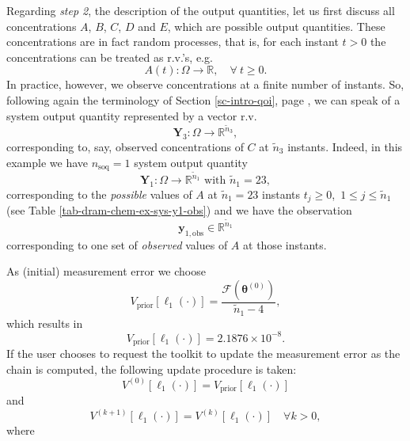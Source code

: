 Regarding {\it step 2}, the description of the output quantities, let us first discuss all concentrations $A$, $B$, $C$, $D$ and $E$, which are possible output quantities.
These concentrations are in fact random processes, that is, for each instant $t>0$ the concentrations can be treated as r.v.'s, e.g.
\begin{equation*}
A(t):\Omega\rightarrow\mathbb{R},\quad\forall~t\geqslant 0.
\end{equation*}
In practice, however, we observe concentrations at a finite number of instants.
So, following again the terminology of Section \ref{sc-intro-qoi}, page \pageref{sc-intro-qoi}, we can speak of a system output quantity
represented by a vector r.v. 
\begin{equation*}
\mathbf{Y}_3:\Omega\rightarrow\mathbb{R}^{{\tilde{n}}_3},
\end{equation*}
corresponding to, say, observed concentrations of $C$ at ${\tilde{n}}_3$ instants.
Indeed, in this example we have
$n_{\text{soq}}=1$ system output quantity
\begin{equation*}
\mathbf{Y}_1:\Omega\rightarrow\mathbb{R}^{{\tilde{n}}_1}\text{ with }{\tilde{n}}_1=23,
\end{equation*}
corresponding to the {\it possible} values of $A$ at ${\tilde{n}}_1=23$ instants $t_j\geqslant 0$,~$1\leqslant j\leqslant {\tilde{n}}_1$ (see Table \ref{tab-dram-chem-ex-sys-y1-obs})
and we have the observation 
\begin{equation*}
\mathbf{y}_{1,\text{obs}}\in\mathbb{R}^{{\tilde{n}}_1}
\end{equation*}
corresponding to one set of {\it observed} values of $A$ at those instants.

As (initial) measurement error we choose
\begin{equation*}
V_{\text{prior}}[\ell_1(\cdot)] = \frac{\mathcal{F}(\boldsymbol{\theta}^{(0)})}{{\tilde{n}}_1-4},
\end{equation*}
which results in
\begin{equation*}
V_{\text{prior}}[\ell_1(\cdot)] = 2.1876\times 10^{-8}.
\end{equation*}
If the user chooses to request the toolkit to update the measurement error as the chain is computed, the following update procedure is taken:
\begin{equation*}
V^{(0)}[\ell_1(\cdot)] = V_{\text{prior}}[\ell_1(\cdot)]
\end{equation*}
and
\begin{equation*}
V^{(k+1)}[\ell_1(\cdot)] = V^{(k)}[\ell_1(\cdot)]\quad\forall k>0,
\end{equation*}
where

